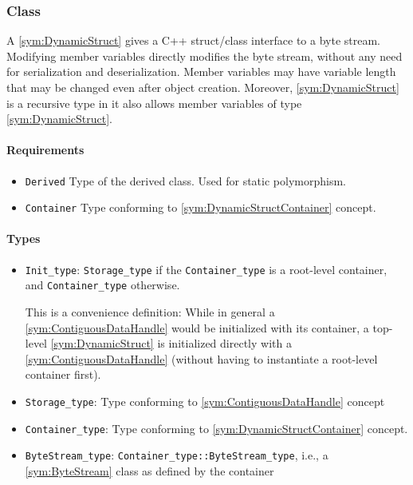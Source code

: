 \subsubsection[Class DynamicStruct]{Class }

A \ref{sym:DynamicStruct} gives a C++ struct/class interface to a byte stream. Modifying member variables directly modifies the byte stream, without any need for serialization and deserialization. Member variables may have variable length that may be changed even after object creation. Moreover, \ref{sym:DynamicStruct} is a recursive type in it also allows member variables of type \ref{sym:DynamicStruct}.

\paragraph{Requirements}

\begin{itemize}
	\item \texttt{Derived} Type of the derived class. Used for static polymorphism.
	\item \texttt{Container} Type conforming to \ref{sym:DynamicStructContainer} concept.
\end{itemize}

\paragraph{Types}

\begin{itemize}
	\item \texttt{Init\_type}: \texttt{Storage\_type} if the \texttt{Container\_type} is a root-level container, and \texttt{Container\_type} otherwise.
	
	This is a convenience definition: While in general a \ref{sym:ContiguousDataHandle} would be initialized with its container, a top-level \ref{sym:DynamicStruct} is initialized directly with a \ref{sym:ContiguousDataHandle} (without having to instantiate a root-level container first).
	
	\item \texttt{Storage\_type}: Type conforming to \ref{sym:ContiguousDataHandle} concept
	\item \texttt{Container\_type}: Type conforming to \ref{sym:DynamicStructContainer} concept.
	\item \texttt{ByteStream\_type}: \texttt{Container\_type::ByteStream\_type}, i.e., a \ref{sym:ByteStream} class as defined by the container
\end{itemize}

